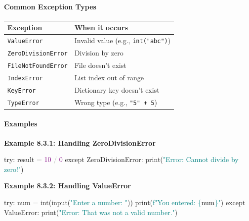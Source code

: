 \documentclass[
  justified,
  openright,
]{tufte-book}
\let\subsubsection\paragraph
\let\paragraph\paragraph
\newcommand{\BuiltInTok}[1]{#1}
\newcommand{\ControlFlowTok}[1]{\textcolor{BrandBlue}{#1}}
\newcommand{\DecValTok}[1]{\textcolor{Purple}{#1}}
\newcommand{\NormalTok}[1]{#1}
\newcommand{\OperatorTok}[1]{\textcolor{DarkGray}{#1}}
\newcommand{\PreprocessorTok}[1]{\textcolor{BrandAccent}{#1}}
\newcommand{\SpecialCharTok}[1]{\textcolor{Teal}{#1}}
\newcommand{\SpecialStringTok}[1]{\textcolor{Teal}{#1}}
\newcommand{\StringTok}[1]{\textcolor{Teal}{#1}}
\newenvironment{Shaded}{%
  \begin{snugshade}
}{%
  \end{snugshade}
}
\let\subsubsection\paragraph
\let\paragraph\paragraph
\begin{document}
\subsubsection{Common Exception Types}\label{common-exception-types}

{\def\LTcaptype{none} %
\begin{longtable}[]{@{}ll@{}}
\toprule\noalign{}
Exception & When it occurs \\
\midrule\noalign{}
\endhead
\bottomrule\noalign{}
\endlastfoot
\texttt{ValueError} & Invalid value (e.g., \texttt{int("abc")}) \\
\texttt{ZeroDivisionError} & Division by zero \\
\texttt{FileNotFoundError} & File doesn't exist \\
\texttt{IndexError} & List index out of range \\
\texttt{KeyError} & Dictionary key doesn't exist \\
\texttt{TypeError} & Wrong type (e.g., \texttt{"5"\ +\ 5}) \\
\end{longtable}
}

\subsubsection{Examples}\label{examples-13}

\textbf{Example 8.3.1: Handling ZeroDivisionError}

\begin{Shaded}
\begin{Highlighting}[]
\ControlFlowTok{try}\NormalTok{:}
\NormalTok{    result }\OperatorTok{=} \DecValTok{10} \OperatorTok{/} \DecValTok{0}
\ControlFlowTok{except} \PreprocessorTok{ZeroDivisionError}\NormalTok{:}
    \BuiltInTok{print}\NormalTok{(}\StringTok{"Error: Cannot divide by zero!"}\NormalTok{)}
\end{Highlighting}
\end{Shaded}

\textbf{Example 8.3.2: Handling ValueError}

\begin{Shaded}
\begin{Highlighting}[]
\ControlFlowTok{try}\NormalTok{:}
\NormalTok{    num }\OperatorTok{=} \BuiltInTok{int}\NormalTok{(}\BuiltInTok{input}\NormalTok{(}\StringTok{"Enter a number: "}\NormalTok{))}
    \BuiltInTok{print}\NormalTok{(}\SpecialStringTok{f"You entered: }\SpecialCharTok{\{}\NormalTok{num}\SpecialCharTok{\}}\SpecialStringTok{"}\NormalTok{)}
\ControlFlowTok{except} \PreprocessorTok{ValueError}\NormalTok{:}
    \BuiltInTok{print}\NormalTok{(}\StringTok{"Error: That was not a valid number."}\NormalTok{)}
\end{Highlighting}
\end{Shaded}
\end{document}
